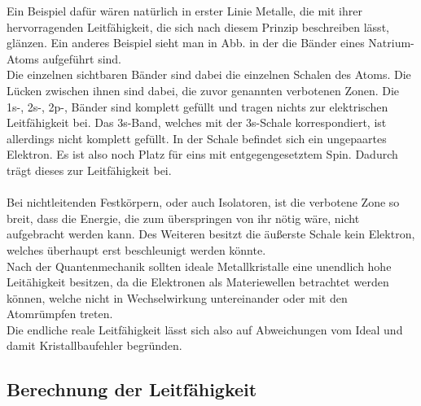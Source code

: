\noindent
Ein Beispiel dafür wären natürlich in erster Linie Metalle, die mit ihrer hervorragenden Leitfähigkeit, die sich nach diesem Prinzip beschreiben lässt, glänzen.
Ein anderes Beispiel sieht man in Abb. in der die Bänder eines Natrium-Atoms aufgeführt sind.\\
Die einzelnen sichtbaren Bänder sind dabei die einzelnen Schalen des Atoms.
Die Lücken zwischen ihnen sind dabei, die zuvor genannten verbotenen Zonen.
Die 1s-, 2s-, 2p-, Bänder sind komplett gefüllt und tragen nichts zur elektrischen Leitfähigkeit bei.
Das 3s-Band, welches mit der 3s-Schale korrespondiert, ist allerdings nicht komplett gefüllt.
In der Schale befindet sich ein ungepaartes Elektron. Es ist also noch Platz für eins mit entgegengesetztem Spin.
Dadurch trägt dieses zur Leitfähigkeit bei.\\\\
\noindent
Bei nichtleitenden Festkörpern, oder auch Isolatoren, ist die verbotene Zone so breit, dass die Energie, 
die zum überspringen von ihr nötig wäre, nicht aufgebracht werden kann. Des Weiteren besitzt die äußerste Schale kein Elektron, welches
überhaupt erst beschleunigt werden könnte.\\
Nach der Quantenmechanik sollten ideale Metallkristalle eine unendlich hohe Leitähigkeit besitzen, da
die Elektronen als Materiewellen betrachtet werden können, welche nicht in Wechselwirkung untereinander oder mit den Atomrümpfen treten.\\
Die endliche reale Leitfähigkeit lässt sich also auf Abweichungen vom Ideal und damit Kristallbaufehler begründen.\\


\subsection{Berechnung der Leitfähigkeit}

